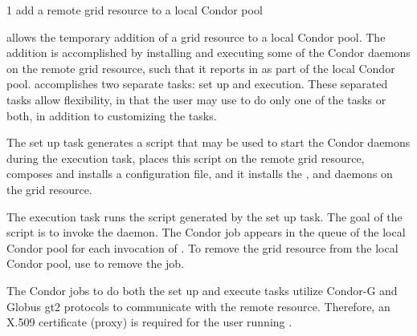 \begin{ManPage}{\label{man-condor-glidein}}{1}
{add a remote grid resource to a local Condor pool}
\Synopsis
{}



\Description

 allows the temporary addition of a grid resource to
a local Condor pool.
The addition is accomplished by installing and executing some of the Condor
daemons on the remote grid resource,
such that it reports in as part of the local Condor pool.
 accomplishes two separate tasks: set up and execution.
These separated tasks allow flexibility, 
in that the user may use  to do only one
of the tasks or both, 
in addition to customizing the tasks.

The set up task generates a script that may be used
to start the Condor daemons during the execution task,
places this script on the remote grid resource,
composes and installs a configuration file,
and it installs the , 
and  daemons on the grid resource.

The execution task runs the script generated by
the set up task.
The goal of the script is to invoke the  daemon.
The Condor job  appears in the queue of the local
Condor pool for each invocation of  .
To remove the grid resource from the local Condor pool,
use  to remove the  job.

The Condor jobs to do both the set up and execute tasks
utilize
Condor-G and Globus gt2 protocols to communicate with the remote resource.
Therefore,
an X.509 certificate (proxy) is required
for the user running .


\end{ManPage}
